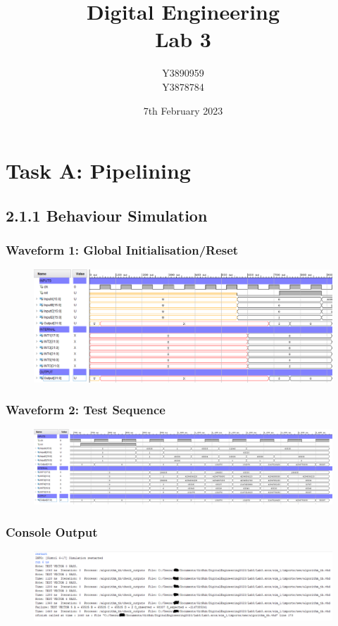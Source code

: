 \documentclass[11pt]{report}
\title{Digital Engineering\\Lab 3}
\author{Y3890959\\Y3878784}
\date{7th February 2023}
\begin{document}
\maketitle

\chapter*{Task A: Pipelining}

\section*{2.1.1 Behaviour Simulation}
\subsection*{Waveform 1: Global Initialisation/Reset}
\begin{figure}[H]
    \includegraphics[width=\columnwidth]{Reports/Lab3/Assets/2.1.1_waveform-initial-reset.png}
\end{figure}

\subsection*{Waveform 2: Test Sequence}
\begin{figure}[H]
    \includegraphics[width=\columnwidth]{Reports/Lab3/Assets/2.1.1_waveform-test-sequence.png}
\end{figure}

\subsection*{Console Output}
\begin{figure}[H]
    \includegraphics[width=\columnwidth]{Reports/Lab3/Assets/2.1.1_console.png}
\end{figure}
\end{document}
